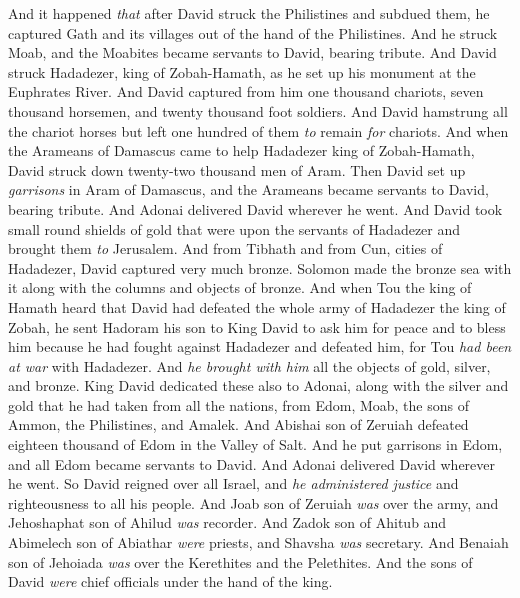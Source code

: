 \begin{biblechapter} %
 And it happened \textit{that} after David struck the Philistines and subdued them, he captured Gath and its villages out of the hand of the Philistines.
\verse And he struck Moab, and the Moabites became servants to David, bearing tribute.
\verse And David struck Hadadezer, king of Zobah-Hamath, as he set up his monument at the Euphrates River.
\verse And David captured from him one thousand chariots, seven thousand horsemen, and twenty thousand foot soldiers. And David hamstrung all the chariot horses but left one hundred of them \textit{to} remain \textit{for} chariots.
\verse And when the Arameans of Damascus came to help Hadadezer king of Zobah-Hamath, David struck down twenty-two thousand men of Aram.
\verse Then David set up \textit{garrisons} in Aram of Damascus, and the Arameans became servants to David, bearing tribute. And Adonai delivered David wherever he went.
\verse And David took small round shields of gold that were upon the servants of Hadadezer and brought them \textit{to} Jerusalem.
\verse And from Tibhath and from Cun, cities of Hadadezer, David captured very much bronze. Solomon made the bronze sea with it along with the columns and objects of bronze.
\verse And when Tou the king of Hamath heard that David had defeated the whole army of Hadadezer the king of Zobah,
\verse he sent Hadoram his son to King David to ask him for peace and to bless him because he had fought against Hadadezer and defeated him, for Tou \textit{had been at war} with Hadadezer. And \textit{he brought with him} all the objects of gold, silver, and bronze.
\verse King David dedicated these also to Adonai, along with the silver and gold that he had taken from all the nations, from Edom, Moab, the sons of Ammon, the Philistines, and Amalek.
\verse And Abishai son of Zeruiah defeated eighteen thousand of Edom in the Valley of Salt.
\verse And he put garrisons in Edom, and all Edom became servants to David. And Adonai delivered David wherever he went.
 So David reigned over all Israel, and \textit{he administered justice} and righteousness to all his people.
\verse And Joab son of Zeruiah \textit{was} over the army, and Jehoshaphat son of Ahilud \textit{was} recorder.
\verse And Zadok son of Ahitub and Abimelech son of Abiathar \textit{were} priests, and Shavsha \textit{was} secretary.
\verse And Benaiah son of Jehoiada \textit{was} over the Kerethites and the Pelethites. And the sons of David \textit{were} chief officials under the hand of the king.
\end{biblechapter}

